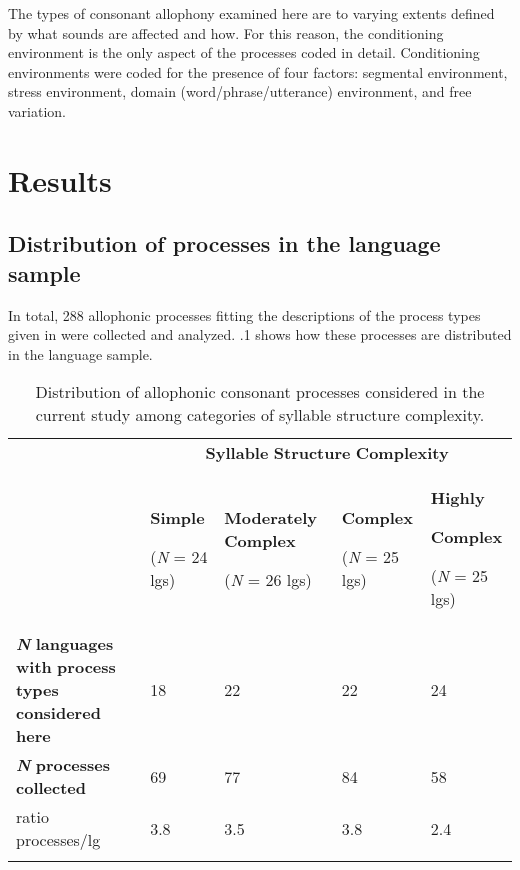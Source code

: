   The types of consonant allophony examined here are to varying extents defined by what sounds are affected and how. For this reason, the conditioning environment is the only aspect of the processes coded in detail. Conditioning environments were coded for the presence of four factors: segmental environment, stress environment, domain (word/phrase/utterance) environment, and free variation.

\section{Results}\label{sec:7.3}
\subsection{Distribution of processes in the language sample}\label{sec:7.3.1}

  In total, 288 allophonic processes fitting the descriptions of the process types given in  were collected and analyzed. .1 shows how these processes are distributed in the language sample. 

\begin{table}
\begin{tabularx}{\textwidth}{XXXXX}
\lsptoprule
 & \multicolumn{4}{c}{ \textbf{Syllable} \textbf{Structure} \textbf{Complexity}}\\
& { \textbf{Simple}}

 (\textit{N} = 24 lgs) & { \textbf{Moderately} \textbf{Complex}}

 (\textit{N} = 26 lgs) & { \textbf{Complex}}

 (\textit{N} = 25 lgs) & { \textbf{Highly} }

{ \textbf{Complex}}

 (\textit{N} = 25 lgs)\\
 \textbf{\textit{N} }\textbf{languages} \textbf{with} \textbf{process} \textbf{types} \textbf{considered} \textbf{here} & 18 & 22 & 22 & 24\\
 \textbf{\textit{N}} \textbf{processes} \textbf{collected} & 69 & 77 & 84 & 58\\
 ratio processes/lg & 3.8 & 3.5 & 3.8 & 2.4\\
\lspbottomrule
\end{tabularx}
\caption{\label{7.1}Distribution of allophonic consonant processes considered in the current study among categories of syllable structure complexity.}
\end{table}

